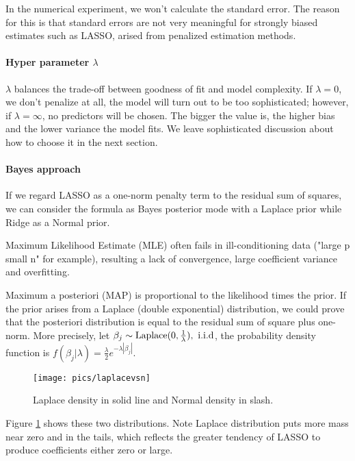 \documentclass[]{article}
\begin{document}
In the numerical experiment, we won't calculate the standard error. The reason for this is that standard errors are not very meaningful for strongly biased estimates such as LASSO, arised from penalized estimation methods.

\paragraph{Hyper parameter $\lambda$}
$\lambda$ balances the trade-off between goodness of fit and model complexity. If $\lambda=0$, we don't penalize at all, the model will turn out to be too sophisticated; however, if  $\lambda=\infty$, no predictors will be chosen. The bigger the value is, the higher bias and the lower variance the model fits. We leave sophisticated discussion about how to choose it in the next section.

\paragraph{Bayes approach}
If we regard LASSO as a one-norm penalty term to the residual sum of squares, we can consider the formula as Bayes posterior mode with a Laplace prior\cite{williams1995bayesian} while Ridge as a Normal prior.

Maximum Likelihood Estimate (MLE) often fails in ill-conditioning data ("large p small n" for example), resulting a lack of convergence, large coefficient variance and overfitting.

Maximum a posteriori (MAP) is proportional to the likelihood times the prior. If the prior arises from a Laplace (double exponential) distribution\cite{efron1986double}, we could prove that the posteriori distribution is equal to the residual sum of square plus one-norm. More precisely, let $ \beta_j\sim \rm Laplace(0,\frac{1}{\lambda}),\ i.i.d $, the probability density function is $f(\beta_j|\lambda)=\frac{\lambda}{2}e^{-\lambda|\beta_j|}$.

\begin{figure}[H]
	\centering
	\texttt{[image: pics/laplacevsn]}
	\caption{Laplace density in solid line and Normal density in slash.\label{fig=laplacevsn}}
	
\end{figure}

Figure \ref{fig=laplacevsn} shows these two distributions. Note Laplace distribution puts more mass near zero and in the tails, which reflects the greater tendency of LASSO to produce coefficients either zero or large.
\end{document}
